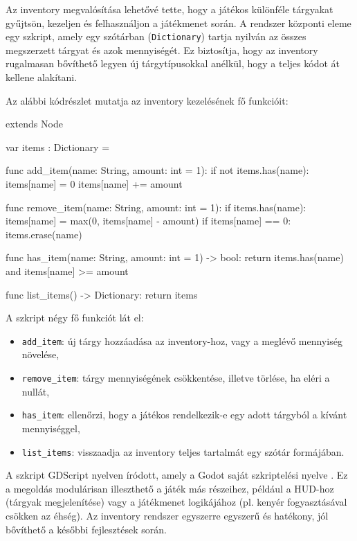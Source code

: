 \documentclass[12pt,a4paper]{article}
\begin{document}
Az inventory megvalósítása lehetővé tette, hogy a játékos különféle tárgyakat gyűjtsön, kezeljen és felhasználjon a játékmenet során. A rendszer központi eleme egy szkript, amely egy szótárban (\texttt{Dictionary}) tartja nyilván az összes megszerzett tárgyat és azok mennyiségét. Ez biztosítja, hogy az inventory rugalmasan bővíthető legyen új tárgytípusokkal anélkül, hogy a teljes kódot át kellene alakítani.  


Az alábbi kódrészlet mutatja az inventory kezelésének fő funkcióit:  


\begin{python}
extends Node

var items : Dictionary = {}

func add_item(name: String, amount: int = 1):
	if not items.has(name):
		items[name] = 0
	items[name] += amount

func remove_item(name: String, amount: int = 1):
	if items.has(name):
		items[name] = max(0, items[name] - amount)
		if items[name] == 0:
			items.erase(name)

func has_item(name: String, amount: int = 1) -> bool:
	return items.has(name) and items[name] >= amount

func list_items() -> Dictionary:
	return items
\end{python}

A szkript négy fő funkciót lát el:  
\begin{itemize}
    \item \texttt{add\_item}: új tárgy hozzáadása az inventory-hoz, vagy a meglévő mennyiség növelése,  
    \item \texttt{remove\_item}: tárgy mennyiségének csökkentése, illetve törlése, ha eléri a nullát,  
    \item \texttt{has\_item}: ellenőrzi, hogy a játékos rendelkezik-e egy adott tárgyból a kívánt mennyiséggel,  
    \item \texttt{list\_items}: visszaadja az inventory teljes tartalmát egy szótár formájában.  
\end{itemize}

A szkript GDScript nyelven íródott, amely a Godot saját szkriptelési nyelve \cite{gdscript_ref}.
Ez a megoldás modulárisan illeszthető a játék más részeihez, például a HUD-hoz (tárgyak megjelenítése) vagy a játékmenet logikájához (pl. kenyér fogyasztásával csökken az éhség). Az inventory rendszer egyszerre egyszerű és hatékony, jól bővíthető a későbbi fejlesztések során.
\end{document}
